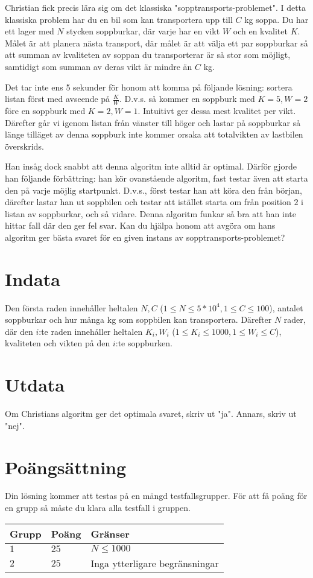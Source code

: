 Christian fick precis lära sig om det klassiska "sopptransports-problemet". I detta klassiska problem har du en bil som kan transportera upp till $C$ kg soppa.
Du har ett lager med $N$ stycken soppburkar, där varje har en vikt $W$ och en kvalitet $K$. Målet är att planera nästa transport, där målet är att
välja ett par soppburkar så att summan av kvaliteten av soppan du transporterar är så stor som möjligt, samtidigt som summan av deras vikt är mindre än $C$ kg.

Det tar inte ens 5 sekunder för honom att komma på följande lösning: sortera listan först med avseende på $\frac{K}{W}$. D.v.s. så kommer en soppburk med $K=5,W=2$ före en soppburk
med $K=2,W=1$. Intuitivt ger dessa mest kvalitet per vikt. Därefter går vi igenom listan från vänster till höger och lastar på soppburkar så länge tilläget av denna soppburk inte
kommer orsaka att totalvikten av lastbilen överskrids.

Han insåg dock snabbt att denna algoritm inte alltid är optimal. Därför gjorde han följande förbättring: han kör ovanstående algoritm, fast testar även att starta den på
varje möjlig startpunkt. D.v.s., först testar han att köra den från början, därefter lastar han ut soppbilen och testar att istället starta om från position $2$ i listan av
soppburkar, och så vidare. Denna algoritm funkar så bra att han inte hittar fall där den ger fel svar. Kan du hjälpa honom att avgöra om hans algoritm ger bästa svaret
för en given instans av sopptransports-problemet?

\section*{Indata}
Den första raden innehåller heltalen $N, C$ ($1 \leq N \leq 5*10^4, 1 \leq C \leq 100$), antalet soppburkar och hur många kg som soppbilen kan transportera.
Därefter $N$ rader, där den $i$:te raden innehåller heltalen $K_i,W_i$ ($1 \leq K_i \leq 1000, 1 \leq W_i \leq C$), kvaliteten och vikten på den $i$:te soppburken.

\section*{Utdata}
Om Christians algoritm ger det optimala svaret, skriv ut "ja". Annars, skriv ut "nej".

\section*{Poängsättning}
Din lösning kommer att testas på en mängd testfallsgrupper.
För att få poäng för en grupp så måste du klara alla testfall i gruppen.

\noindent
\begin{tabular}{| l | l | p{12cm} |}
  \hline
  \textbf{Grupp} & \textbf{Poäng} & \textbf{Gränser} \\ \hline
  $1$    & $25$      & $ N \leq 1000$ \\ \hline
  $2$    & $25$      & Inga ytterligare begränsningar \\ \hline
\end{tabular}
